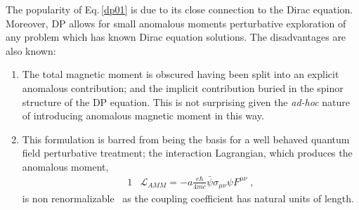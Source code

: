 \documentclass[epj]{svjour}
\begin{document}
The popularity of Eq.\,\eqref{dp01} is due to its close connection to the Dirac equation. Moreover, DP allows for small anomalous moments perturbative exploration of any problem which has known Dirac equation solutions. The disadvantages are also known: 
\begin{enumerate}
\item 
The total magnetic moment is obscured having been split into an explicit anomalous contribution; and the implicit contribution buried in the spinor structure of the DP equation. This is not surprising given the \emph{ad-hoc} nature of introducing anomalous magnetic moment in this way. 
\item 
This formulation is barred from being the basis for a well behaved quantum field perturbative treatment; the interaction Lagrangian, which produces the anomalous moment,
\begin{alignat}{1}
\label{dp07} &\mathcal{L}_{AMM}=-a\frac{e\hbar}{4mc}\bar{\psi}\sigma_{\mu\nu}\psi F^{\mu\nu}\;,\end{alignat}
is non renormalizable~\cite{Knecht:2003kc} as the coupling coefficient has natural units of length.
\end{enumerate} 


\end{document}
